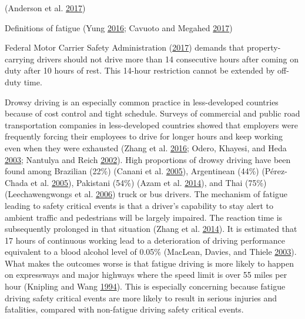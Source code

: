 \documentclass[12pt]{book}
\numberwithin{equation}{chapter}
\begin{document}
(Anderson et al. \protect\hyperlink{ref-anderson2017exploratory}{2017})

Definitions of fatigue (Yung \protect\hyperlink{ref-yung2016fatigue}{2016}; Cavuoto and Megahed \protect\hyperlink{ref-cavuoto2017understanding}{2017})

Federal Motor Carrier Safety Administration (\protect\hyperlink{ref-hos2017}{2017}) demands that property-carrying drivers should not drive more than 14 consecutive hours after coming on duty after 10 hours of rest. This 14-hour restriction cannot be extended by off-duty time.

Drowsy driving is an especially common practice in less-developed countries because of cost control and tight schedule. Surveys of commercial and public road transportation companies in less-developed countries showed that employers were frequently forcing their employees to drive for longer hours and keep working even when they were exhausted (Zhang et al. \protect\hyperlink{ref-zhang2016traffic}{2016}; Odero, Khayesi, and Heda \protect\hyperlink{ref-odero2003road}{2003}; Nantulya and Reich \protect\hyperlink{ref-nantulya2002neglected}{2002}). High proportions of drowsy driving have been found among Brazilian (22\%) (Canani et al. \protect\hyperlink{ref-canani2005prevalence}{2005}), Argentinean (44\%) (Pérez-Chada et al. \protect\hyperlink{ref-perez2005sleep}{2005}), Pakistani (54\%) (Azam et al. \protect\hyperlink{ref-azam2014comparison}{2014}), and Thai (75\%) (Leechawengwongs et al. \protect\hyperlink{ref-leechawengwongs2006role}{2006}) truck or bus drivers. The mechanism of fatigue leading to safety critical events is that a driver's capability to stay alert to ambient traffic and pedestrians will be largely impaired. The reaction time is subsequently prolonged in that situation (Zhang et al. \protect\hyperlink{ref-zhang2014study}{2014}). It is estimated that 17 hours of continuous working lead to a deterioration of driving performance equivalent to a blood alcohol level of 0.05\% (MacLean, Davies, and Thiele \protect\hyperlink{ref-maclean2003hazards}{2003}). What makes the outcomes worse is that fatigue driving is more likely to happen on expressways and major highways where the speed limit is over 55 miles per hour (Knipling and Wang \protect\hyperlink{ref-knipling1994crashes}{1994}). This is especially concerning because fatigue driving safety critical events are more likely to result in serious injuries and fatalities, compared with non-fatigue driving safety critical events.
\end{document}
